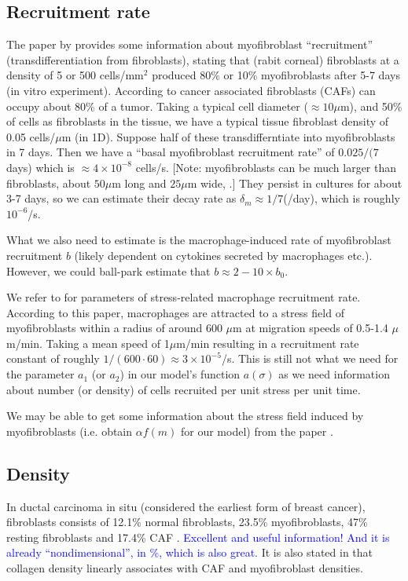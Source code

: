 \documentclass{article}
\newcommand{\LEK}[1]{\textcolor{blue}{#1}}
\begin{document}
    \subsection{Recruitment rate}
        The paper by \cite{masur1996myofibroblasts} provides some information about myofibroblast ``recruitment'' (transdifferentiation from fibroblasts), stating that (rabit corneal) fibroblasts at a density of 5 or 500 cells/mm$^2$ produced 80\% or 10\% myofibroblasts after 5-7 days (in vitro experiment). According to \cite{gascard2016carcinoma} cancer associated fibroblasts (CAFs) can occupy about 80\% of a tumor. Taking a typical cell diameter ($\approx 10\mu$m), and 50\% of cells as fibroblasts in the tissue, we have a typical tissue fibroblast density of 0.05 cells/$\mu$m (in 1D). Suppose half of these transdifferntiate into myofibroblasts in 7 days. Then we have a ``basal myofibroblast recruitment rate'' of  $0.025/(7$ days) which is $\approx 4 \times 10^{-8}$ cells/s. [Note: myofibroblasts can be much larger than fibroblasts, about $50\mu$m long and $25\mu$m wide, \cite{masur1996myofibroblasts}.] They persist in cultures for about 3-7 days, so we can estimate their decay rate as $\delta_m\approx 1/7$(/day), which is roughly $10^{-6}$/s.

        What we also need to estimate is the macrophage-induced rate of myofibroblast recruitment $b$ (likely dependent on cytokines secreted by macrophages etc.). However, we could ball-park estimate that $b \approx 2-10 \times b_0$. 

        We refer to \cite{pakshir2019dynamic} for parameters of stress-related macrophage recruitment rate. According to this paper, macrophages are attracted to a stress field of myofibroblasts within a radius of around 600 $\mu$m at migration speeds of 0.5-1.4 $\mu$m/min. Taking a mean speed of 1$\mu$m/min resulting in a recruitment rate constant of roughly $1/(600\cdot 60)\approx 3 \times 10^{-5} $/s. This is still not what we need for the parameter $a_1$ (or $a_2$) in our model's function $a(\sigma)$ as we need information about number (or density) of cells recruited per unit stress per unit time. 

        We may be able to get some information about the stress field induced by myofibroblasts (i.e. obtain $\alpha f(m)$ for our model) from the paper \cite{pakshir2019dynamic}.

    \subsection{Density}
        In ductal carcinoma in situ (considered the earliest form of breast cancer), fibroblasts consists of 12.1\% normal fibroblasts, 23.5\% myofibroblasts, 47\% resting fibroblasts and 17.4\% CAF \cite{risom2022transition}. \LEK{Excellent and useful information! And it is already ``nondimensional'', in \%, which is also great.} It is also stated in \cite{risom2022transition} that collagen density linearly associates with CAF and myofibroblast densities. 
\end{document}
